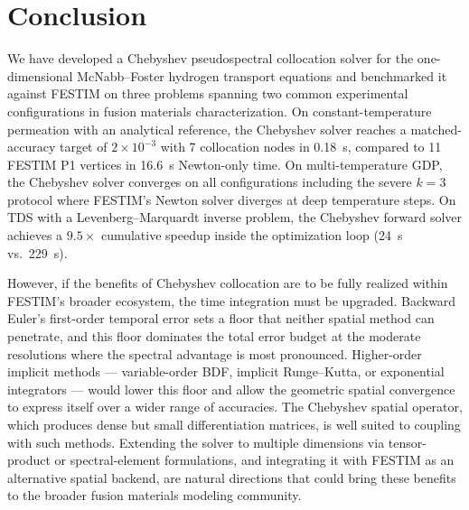 \section{Conclusion}\label{sec:conclusion}

We have developed a Chebyshev pseudospectral collocation solver for the one-dimensional McNabb--Foster hydrogen transport equations and benchmarked it against FESTIM on three problems spanning two common experimental configurations in fusion materials characterization. On constant-temperature permeation with an analytical reference, the Chebyshev solver reaches a matched-accuracy target of $2\times 10^{-3}$ with 7 collocation nodes in \SI{0.18}{\second}, compared to 11 FESTIM P1 vertices in \SI{16.6}{\second} Newton-only time. On multi-temperature GDP, the Chebyshev solver converges on all configurations including the severe $k = 3$ protocol where FESTIM's Newton solver diverges at deep temperature steps. On TDS with a Levenberg--Marquardt inverse problem, the Chebyshev forward solver achieves a $9.5\times$ cumulative speedup inside the optimization loop (\SI{24}{\second} vs.\ \SI{229}{\second}).

However, if the benefits of Chebyshev collocation are to be fully realized within FESTIM's broader ecosystem, the time integration must be upgraded. Backward Euler's first-order temporal error sets a floor that neither spatial method can penetrate, and this floor dominates the total error budget at the moderate resolutions where the spectral advantage is most pronounced. Higher-order implicit methods --- variable-order BDF, implicit Runge--Kutta, or exponential integrators --- would lower this floor and allow the geometric spatial convergence to express itself over a wider range of accuracies. The Chebyshev spatial operator, which produces dense but small differentiation matrices, is well suited to coupling with such methods. Extending the solver to multiple dimensions via tensor-product or spectral-element formulations, and integrating it with FESTIM as an alternative spatial backend, are natural directions that could bring these benefits to the broader fusion materials modeling community.
